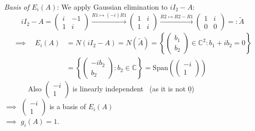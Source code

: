 \documentclass[
  12pt,
  a4paper,
  twoside]{article}
\theoremstyle{plain}
\theoremstyle{definition}
\begin{document}
\emph{Basis of \(E_{i}(A)\)}: We apply Gaussian elimination to \(iI_2-A\):
\[
iI_{2} - A = \begin{pmatrix} i & -1 \\ 1 & i \end{pmatrix}
\xrightarrow{R1 \mapsto (-i)R1}
\begin{pmatrix} 1 & i \\ 1 & i \end{pmatrix}
\xrightarrow{R2 \mapsto R2 - R1}
\begin{pmatrix} 1 & i \\ 0 & 0 \end{pmatrix}
=: \tilde A
\]
\begin{align*}
\implies\quad E_{i}(A) &= N(iI_2-A) = N(\tilde A) = \left\{ \begin{pmatrix} b_{1} \\ b_{2} \end{pmatrix} \in \mathbb{C}^{2} : b_{1} + ib_{2} = 0 \right\} \\
&= \left\{ \begin{pmatrix} -ib_{2} \\ b_{2} \end{pmatrix} : b_{2} \in \mathbb{C} \right\} = \mathrm{Span} \left( \begin{pmatrix} -i \\ 1 \end{pmatrix} \right)
\end{align*}
~~~~~~ Also \(\begin{pmatrix}-i\\1\end{pmatrix}\) is linearly independent
\hfill~{(as it is not \(\underline{0}\))}\\
\(\implies\) \(\begin{pmatrix}-i\\1\end{pmatrix}\) is a basis of \(E_i(A)\)\\
\(\implies\) \(g_{i}(A) = 1\).
\end{document}
